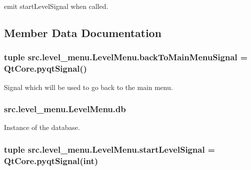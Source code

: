 emit start\+Level\+Signal when called. 



\subsection{Member Data Documentation}
\hypertarget{classsrc_1_1level__menu_1_1_level_menu_a769225d8895542b2c7118110d7b2ff9d}{}
\subsubsection[{back\+To\+Main\+Menu\+Signal}]{\setlength{\rightskip}{0pt plus 5cm}tuple src.\+level\+\_\+menu.\+Level\+Menu.\+back\+To\+Main\+Menu\+Signal = Qt\+Core.\+pyqt\+Signal()\hspace{0.3cm}{\ttfamily [static]}}\label{classsrc_1_1level__menu_1_1_level_menu_a769225d8895542b2c7118110d7b2ff9d}


Signal which will be used to go back to the main menu. 

\hypertarget{classsrc_1_1level__menu_1_1_level_menu_a3224111dd78be1b15cc943f41daef0cf}{}
\subsubsection[{db}]{\setlength{\rightskip}{0pt plus 5cm}src.\+level\+\_\+menu.\+Level\+Menu.\+db}\label{classsrc_1_1level__menu_1_1_level_menu_a3224111dd78be1b15cc943f41daef0cf}


Instance of the database. 

\hypertarget{classsrc_1_1level__menu_1_1_level_menu_a14a5a5bd905bb0d8e732a33bed71ef44}{}
\subsubsection[{start\+Level\+Signal}]{\setlength{\rightskip}{0pt plus 5cm}tuple src.\+level\+\_\+menu.\+Level\+Menu.\+start\+Level\+Signal = Qt\+Core.\+pyqt\+Signal(int)\hspace{0.3cm}{\ttfamily [static]}}\label{classsrc_1_1level__menu_1_1_level_menu_a14a5a5bd905bb0d8e732a33bed71ef44}


